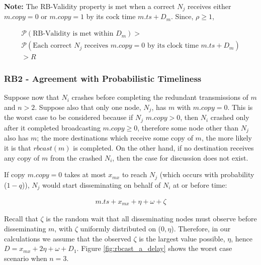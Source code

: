         \textbf{Note:} The RB-Validity property is met when a correct $N_j$ receives either $m.copy = 0$ or $m.copy = 1$ by its cock time $m.ts + D_m$.  Since, $\rho \geq 1$,
        
         \begin{equation}
        \begin{aligned}
                \mathcal{P}(\text{RB-Validity is met within } D_m) > \\ \mathcal{P}(\text{Each correct } N_j \text{ receives } m.copy = 0 \text{ by its clock time } m.ts+D_m) \\ > R
            \end{aligned}
        \end{equation}
        
        
    \subsubsection*{RB2 - Agreement with Probabilistic Timeliness}
    Suppose now that $N_i$ crashes before completing the redundant transmissions of $m$ and $n>2$.  Suppose also that only one node, $N_j$, has $m$ with $m.copy=0$. This is the worst case to be considered because if $N_j$ $m.copy>0$, then $N_i$ crashed only after it completed broadcasting $m.copy \geq 0$, therefore some node other than $N_j$ also has $m$; the more destinations which receive some copy of $m$, the more likely it is that $rbcast(m)$ is completed.  On the other hand, if no destination receives any copy of $m$ from the crashed $N_i$, then the case for discussion does not exist.  
    
    If copy $m.copy = 0$ takes at most $x_{mx}$ to reach $N_j$ (which occurs with probability ($1-q$)), $N_j$ would start disseminating on behalf of $N_i$ at or before time:
    
    \begin{equation}
             \begin{aligned}
                m.ts+ x_{mx} + \eta + \omega +\zeta
             \end{aligned}
         \end{equation}    
    
    Recall that $\zeta$ is the random wait that all disseminating nodes must observe before disseminating $m$, with $\zeta$ uniformly distributed on ($0, \eta$).  Therefore, in our calculations we assume that the observed $\zeta$ is the largest value possible, $\eta$, hence $D = x_{mx} + 2\eta + \omega + D_1$.  Figure \ref{fig:rbcast_a_delay} shows the worst case scenario when $n=3$.  
    
